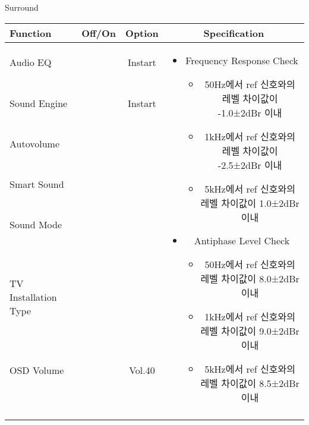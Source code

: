 \begin{frame}[t]{Surround}
\begin{tiny}
\begin{tabular}{@{}lccc@{}}
\toprule
Function & Off/On & Option & Specification \\
\midrule
Audio EQ & \color{black}{Off} & Instart &
\multirow{10}{60mm}{
\begin{itemize}\vspace{-3mm}
\item Frequency Response Check
	\begin{itemize}
		\item 50Hz에서 ref 신호와의 레벨 차이값이 -1.0±2dBr 이내
		\item 1kHz에서 ref 신호와의 레벨 차이값이 -2.5±2dBr 이내
		\item 5kHz에서 ref 신호와의 레벨 차이값이 1.0±2dBr 이내	
	\end{itemize}
\item Antiphase Level Check
	\begin{itemize}
		\item 50Hz에서 ref 신호와의 레벨 차이값이 8.0±2dBr 이내
		\item 1kHz에서 ref 신호와의 레벨 차이값이 9.0±2dBr 이내
		\item 5kHz에서 ref 신호와의 레벨 차이값이 8.5±2dBr 이내
	\end{itemize}
\end{itemize}
} \\
Sound Engine & \color{blue}{On} & Instart & \\
Autovolume & \color{black}{Off} & & \\
Smart Sound & \color{black}{Off} & & \\
Sound Mode & \color{blue}{On} & \color{blue}{Surround} & \\
TV Installation Type & \color{blue}{On} & \color{black}{Standtype1} & \\
OSD Volume & \color{blue}{On} & Vol.40 & \\
& & & \\
& & & \\
& & & \\
& & & \\
\midrule
\end{tabular}
\end{tiny}


\end{frame}
